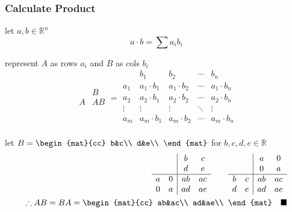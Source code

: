 		\subsubsection{Calculate Product}
			\begin{definition}
				let $a,b\in\mathbb{R}^n$
				$$a\cdot b=\sum a_ib_i$$
			\end{definition}
			\begin{algorithm}[$AB$]
				represent $A$ as rows $a_i$ and $B$ as cols $b_i$
				$$\begin{array}{c|c}
					&B\\\hline
					A&AB\\
				\end{array}=\begin{array}{c|cccc}
					&b_1&b_2&\cdots&b_n\\ \hline
					a_1&a_1\cdot b_1 & a_1\cdot b_2 & \cdots & a_1\cdot b_n\\
					a_2&a_2\cdot b_1 & a_2\cdot b_2 & \cdots & a_2\cdot b_n\\
					\vdots&\vdots & \vdots & \ddots & \vdots\\
					a_m&a_m\cdot b_1 & a_m\cdot b_2 & \cdots & a_m\cdot b_n\\
				\end{array}$$
			\end{algorithm}
			\begin{example}[Prove $\forall B\in\mathbb{R}^{2\times2}\enspace A=\begin{mat}{cc} a&0\\ 0&a\\ \end{mat}$ commutes with $B$]
				let $B=\begin{mat}{cc} b&c\\ d&e\\ \end{mat}$ for $b,c,d,e\in\mathbb{R}$
				\begin{align*}
					\begin{array}{cc|cc}
						&&b&c\\
						&&d&e\\\hline
						a&0&ab&ac\\
						0&a&ad&ae\\
					\end{array}\qquad
					\begin{array}{cc|cc}
						&&a&0\\
						&&0&a\\\hline
						b&c&ab&ac\\
						d&e&ad&ae\\
					\end{array}\\
					\therefore AB=BA=\begin{mat}{cc}
						ab&ac\\
						ad&ae\\
					\end{mat}\quad\blacksquare
				\end{align*}
			\end{example}

